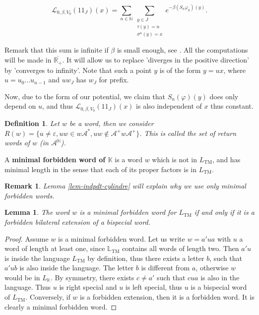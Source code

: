 \documentclass[11 pt]{article}
\newtheorem{lemma}[proposition]{Lemma}
\newtheorem{definition}[proposition]{Definition}
\newtheorem{remark}[proposition]{Remark}
\newcommand{\BBone}{{1\!\!1}}
\theoremstyle{definition}
\begin{document}
\begin{equation}\label{eq-operator2}
\mathcal{L}_{0,\beta,V_0}(\BBone_J)(x)=\displaystyle\sum_{n\in\mathbb{N}}\sum_{\substack{y \in J\\ \tau(y)=n\\ \sigma^n(y)=x}}e^{-\beta(S_n\varphi_0)(y)}.
\end{equation}

Remark that this sum is infinite if $\beta$ is small enough, see \cite{Ishaq-Leplaideur-22}. All the computations will be made in $\overline{\mathbb R_+}$. It will allow us to replace 'diverges in the positive direction' by 'converges to infinity'. Note that such a point $y$ is of the form $y=ux$, where $u=u_0\dots u_{n-1}$ and $uw_J$ has $w_J$ for prefix.
   
   Now, due to the form of our potential, we claim that $S_{n}(\varphi)(y)$ does only depend on $u$, and thus $\mathcal{L}_{0,\beta,V_0}(\BBone_J)(x)$ is also independent of $x$ thus constant.

\begin{definition}
Let $w$ be a word, then we consider $R(w)=\{u\neq\varepsilon, uw\in w\mathcal A^*, uw\notin\mathcal{A}^{+}w\mathcal{A}^{+}
\}$. This is called the set of return words of $w$ (in $\mathcal A^{\mathbb N}$).
\end{definition}

A {\bf minimal forbidden word of $\mathbb K$} is a word $w$ which is not in $L_{\mathrm{TM}}$, and has minimal length in the sense that each of its proper factors is in $L_{\mathrm{TM}}$.


\begin{remark}
Lemma \ref{lem-indpdt-cylindre} will explain why we use only minimal forbidden words. %
\end{remark}


\begin{lemma}\label{lem-return-bisp}
The word $w$ is a minimal forbidden word for $L_\mathrm{TM}$ if and only if it is a forbidden bilateral extension of a bispecial word.
\end{lemma}
\begin{proof}
Assume $w$ is a minimal forbidden word. Let us write $w=a'ua$ with $u$ a word of length at least one, since $\mathbb L_{\mathrm{TM}}$ contains all words of length two. Then $a'u$ is inside the language $L_{\mathrm{TM}}$ by definition, thus there exists a letter $b$, such that $a'ub$ is also inside the language. The letter $b$ is different from $a$, otherwise $w$ would be in $L_{\mathbb K}$. By symmetry, there exists $c\neq a'$ such that $cua$ is also in the language. Thus $u$ is right special and $u$ is left special, thus $u$ is a bispecial word of $L_\mathrm{TM}$.
Conversely, if $w$ is a forbidden extension, then it is a forbidden word. It is clearly a minimal forbidden word.

\end{proof}
\end{document}
